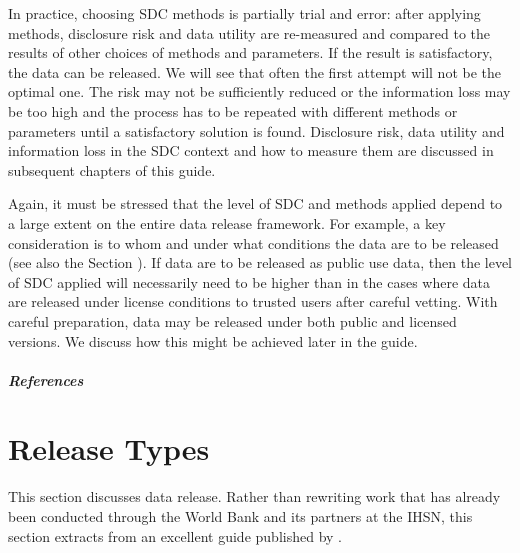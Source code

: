 \documentclass[letterpaper,10pt,english]{sphinxmanual}
\begin{document}
In practice, choosing SDC methods is partially trial and error: after
applying methods, disclosure risk and data utility are re-measured and
compared to the results of other choices of methods and parameters. If
the result is satisfactory, the data can be released. We will see that
often the first attempt will not be the optimal one. The risk may not be
sufficiently reduced or the information loss may be too high and the
process has to be repeated with different methods or parameters until a
satisfactory solution is found. Disclosure risk, data utility and
information loss in the SDC context and how to measure them are
discussed in subsequent chapters of this guide.

Again, it must be stressed that the level of SDC and methods applied
depend to a large extent on the entire data release framework. For
example, a key consideration is to whom and under what conditions the
data are to be released (see also the Section ). If data are to be released
as public use data, then the level of SDC applied will necessarily need
to be higher than in the cases where data are released under license
conditions to trusted users after careful vetting. With careful
preparation, data may be released under both public and licensed
versions. We discuss how this might be achieved later in the guide.
\paragraph{References}


\chapter{Release Types}
\label{\detokenize{release_types:release-types}}\label{\detokenize{release_types::doc}}
This section discusses data release. Rather than rewriting work that has
already been conducted through the World Bank and its partners at the
IHSN, this section extracts from an excellent guide published by {\hyperref[\detokenize{release_types:dubo10}]{}}.
\end{document}
